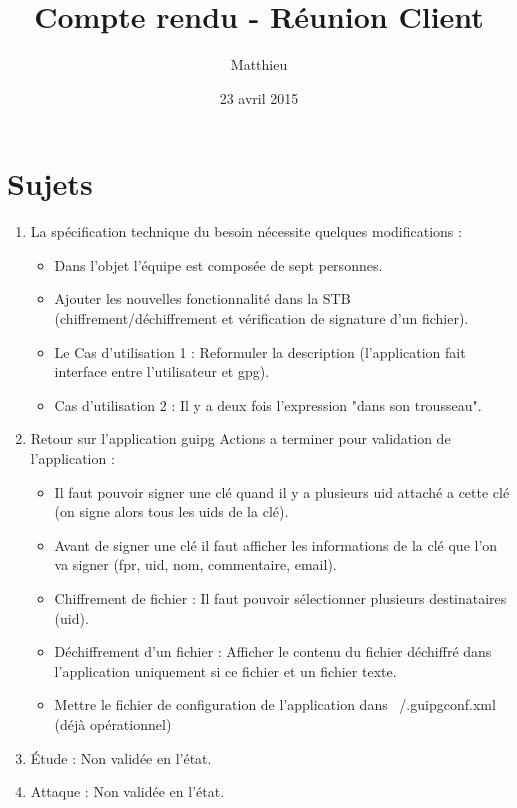 \documentclass{CR-projet}
\title{Compte rendu - Réunion Client}
\author{Matthieu \bsc{FIN}}
\date{23 avril 2015}
\begin{document}
\maketitle
\newpage

\newpage

\section{Sujets}

\begin{enumerate}
	\item La spécification technique du besoin nécessite quelques modifications :
	\begin{itemize}
		\item Dans l'objet l'équipe est composée de sept personnes.
		\item Ajouter les nouvelles fonctionnalité dans la STB (chiffrement/déchiffrement et vérification de signature d'un fichier).
		\item Le Cas d'utilisation 1 : Reformuler la description (l'application fait interface entre l'utilisateur et gpg).
		\item Cas d'utilisation 2 : Il y a deux fois l'expression "dans son trousseau".
	\end{itemize}
	\item Retour sur l'application guipg Actions a terminer pour validation de l'application :
	\begin{itemize}
		\item Il faut pouvoir signer une clé quand il y a plusieurs uid attaché a cette clé (on signe alors tous les uids de la clé).
		\item Avant de signer une clé il faut afficher les informations de la clé que l'on va signer (fpr, uid, nom, commentaire, email). 
		\item Chiffrement de fichier : Il faut pouvoir sélectionner plusieurs destinataires (uid).
		\item Déchiffrement d'un fichier : Afficher le contenu du fichier déchiffré 
		dans l'application uniquement si ce fichier et un fichier texte.
		\item Mettre le fichier de configuration de l'application dans ~/.guipgconf.xml (déjà opérationnel)
	\end{itemize}
	\item Étude : Non validée en l'état.
	\item Attaque : Non validée en l'état.
\end{enumerate}
\end{document}
